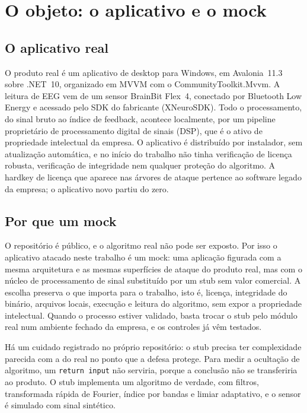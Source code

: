 \section{O objeto: o aplicativo e o mock}
\label{sec:objeto}

\subsection{O aplicativo real}

O produto real é um aplicativo de desktop para Windows, em Avalonia~11.3 sobre .NET~10, organizado em MVVM com o CommunityToolkit.Mvvm. A leitura de EEG vem de um sensor BrainBit Flex~4, conectado por Bluetooth Low Energy e acessado pelo SDK do fabricante (XNeuroSDK). Todo o processamento, do sinal bruto ao índice de feedback, acontece localmente, por um pipeline proprietário de processamento digital de sinais (DSP), que é o ativo de propriedade intelectual da empresa. O aplicativo é distribuído por instalador, sem atualização automática, e no início do trabalho não tinha verificação de licença robusta, verificação de integridade nem qualquer proteção do algoritmo. A hardkey de licença que aparece nas árvores de ataque pertence ao software legado da empresa; o aplicativo novo partiu do zero.

\subsection{Por que um mock}

O repositório é público, e o algoritmo real não pode ser exposto. Por isso o aplicativo atacado neste trabalho é um mock: uma aplicação figurada com a mesma arquitetura e as mesmas superfícies de ataque do produto real, mas com o núcleo de processamento de sinal substituído por um stub sem valor comercial. A escolha preserva o que importa para o trabalho, isto é, licença, integridade do binário, arquivos locais, execução e leitura do algoritmo, sem expor a propriedade intelectual. Quando o processo estiver validado, basta trocar o stub pelo módulo real num ambiente fechado da empresa, e os controles já vêm testados.

Há um cuidado registrado no próprio repositório: o stub precisa ter complexidade parecida com a do real no ponto que a defesa protege. Para medir a ocultação de algoritmo, um \texttt{return input} não serviria, porque a conclusão não se transferiria ao produto. O stub implementa um algoritmo de verdade, com filtros, transformada rápida de Fourier, índice por bandas e limiar adaptativo, e o sensor é simulado com sinal sintético.

